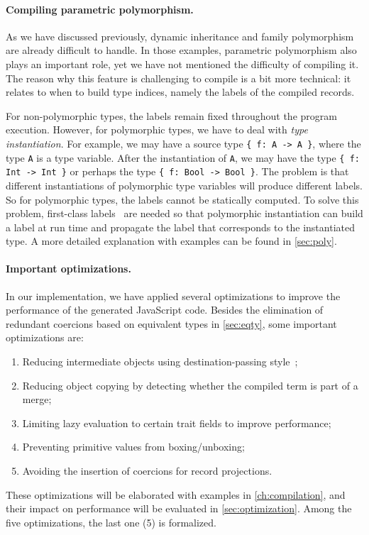 \paragraph{Compiling parametric polymorphism.}
As we have discussed previously, dynamic inheritance and family polymorphism are
already difficult to handle. In those examples, parametric polymorphism also
plays an important role, yet we have not mentioned the difficulty of compiling
it. The reason why this feature is challenging to compile is a bit more
technical: it relates to when to build type indices, namely the labels of the
compiled records.

For non-polymorphic types, the labels remain fixed throughout the program
execution. However, for polymorphic types, we have to deal with \emph{type
instantiation}. For example, we may have a source type \lstinline|{ f: A -> A }|,
where the type \lstinline|A| is a type variable. After the instantiation of
\lstinline|A|, we may have the type \lstinline|{ f: Int -> Int }| or perhaps
the type \lstinline|{ f: Bool -> Bool }|. The problem is that different
instantiations of polymorphic type variables will produce different labels. So
for polymorphic types, the labels cannot be statically computed. To solve this
problem, first-class labels~\citep{leijen2004first} are needed so that
polymorphic instantiation can build a label at run time and propagate the label
that corresponds to the instantiated type. A more detailed explanation with
examples can be found in \autoref{sec:poly}.

\paragraph{Important optimizations.}
In our implementation, we have applied several optimizations to improve the
performance of the generated JavaScript code. Besides the elimination of
redundant coercions based on equivalent types in \autoref{sec:eqty}, some
important optimizations are:
\begin{enumerate}
\item Reducing intermediate objects using destination-passing
      style~\citep{shaikhha2017destination};
\item Reducing object copying by detecting whether the compiled term is part of
      a merge;
\item Limiting lazy evaluation to certain trait fields to improve performance;
\item Preventing primitive values from boxing/unboxing;
\item Avoiding the insertion of coercions for record projections.
\end{enumerate}
These optimizations will be elaborated with examples in
\autoref{ch:compilation}, and their impact on performance will be evaluated in
\autoref{sec:optimization}. Among the five optimizations, the last one (5\th) is
formalized.
